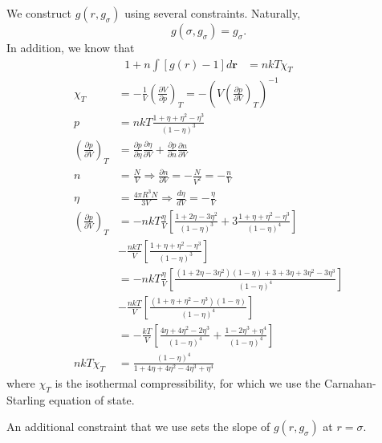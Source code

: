 \documentclass[letterpaper,twocolumn,amsmath,amssymb,pre,aps,10pt]{revtex4-1}
\newcommand{\red}[1]{{\bf \color{red} #1}}
\newcommand{\rr}{\textbf{r}}
\newcommand{\fixme}[1]{\text{\red{[#1]}}}
\begin{document}
We construct $g(r, g_\sigma)$ using several constraints.  Naturally,
\begin{equation}
  g(\sigma, g_\sigma) = g_\sigma.
\end{equation}
In addition, we know that
\begin{align}
  1 + n\int\left[g(r)-1\right]d\rr &= nkT\chi_T
\end{align}
\begin{equation}
  \begin{split}
    \chi_T  &= -\frac{1}{V}\left(\frac{\partial V}{\partial p}\right)_T
    = - \left(V\left(\frac{\partial p}{\partial V}\right)_T\right)^{-1}\\
    p &= nkT\frac{1+\eta+\eta^2-\eta^3}{(1-\eta)^3}\\
    \left(\frac{\partial p}{\partial V}\right)_T &= \frac{\partial p}{\partial\eta}\frac{\partial\eta}{\partial V} + \frac{\partial p}{\partial n}\frac{\partial n}{\partial V}\\
    n &= \frac{N}{V}\Longrightarrow \frac{\partial n}{\partial V} = -\frac{N}{V^2} = -\frac{n}{V}\\
    \eta &= \frac{4\pi R^3N}{3V}\Longrightarrow \frac{d\eta}{dV} = -\frac{\eta}{V}\\
    \left(\frac{\partial p}{\partial V}\right)_T &= -nkT\frac{\eta}{V}\left[\frac{1 + 2\eta - 3\eta^2}{(1-\eta)^3} + 3\frac{1 + \eta + \eta^2 - \eta^3}{(1-\eta)^4}\right]\\
    &  - \frac{nkT}{V}\left[\frac{1+\eta+\eta^2-\eta^3}{(1-\eta)^3}\right]\\
    &= -nkT\frac{\eta}{V}\left[\frac{(1+2\eta-3\eta^2)(1-\eta) + 3 + 3\eta + 3\eta^2 - 3\eta^3}{(1-\eta)^4}\right]\\
    &  - \frac{nkT}{V}\left[\frac{(1+\eta+\eta^2-\eta^3)(1-\eta)}{(1-\eta)^4}\right]\\
    &= -\frac{kT}{V}\left[\frac{4\eta + 4\eta^2 - 2\eta^3}{(1-\eta)^4} + \frac{1 - 2\eta^3 + \eta^4}{(1-\eta)^4}\right]\\
    nkT\chi_T &= \frac{(1-\eta)^4}{1 + 4\eta + 4\eta^2 - 4\eta^3 + \eta^4}
  \end{split}
\end{equation}
where $\chi_T$ is the isothermal compressibility, for which we use the
Carnahan-Starling equation of state.


An additional constraint that we use sets the slope of $g(r,
g_\sigma)$ at $r=\sigma$.  \fixme{explain this}
\end{document}
